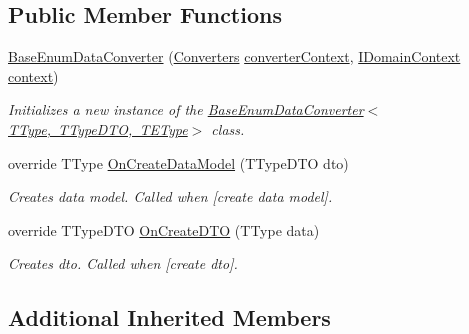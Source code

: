 \subsection*{Public Member Functions}
\begin{DoxyCompactItemize}
\item 
\mbox{\hyperlink{class_bar_none_1_1_shared_1_1_data_converters_1_1_core_1_1_base_enum_data_converter_a3696f6d6da7417940d0ab76b4e64f990}{Base\+Enum\+Data\+Converter}} (\mbox{\hyperlink{class_bar_none_1_1_shared_1_1_data_converters_1_1_converters}{Converters}} \mbox{\hyperlink{class_bar_none_1_1_shared_1_1_data_converter_1_1_core_1_1_base_data_converter_aa680c5a5e00d4330616f98e3cacffa42}{converter\+Context}}, \mbox{\hyperlink{interface_bar_none_1_1_shared_1_1_core_1_1_i_domain_context}{I\+Domain\+Context}} \mbox{\hyperlink{class_bar_none_1_1_shared_1_1_data_converter_1_1_core_1_1_base_data_converter_ae96bc28386162a9cff2a303c270a12b4}{context}})
\begin{DoxyCompactList}\small\item\em Initializes a new instance of the \mbox{\hyperlink{class_bar_none_1_1_shared_1_1_data_converters_1_1_core_1_1_base_enum_data_converter_a3696f6d6da7417940d0ab76b4e64f990}{Base\+Enum\+Data\+Converter$<$\+T\+Type, T\+Type\+D\+T\+O, T\+E\+Type$>$}} class. \end{DoxyCompactList}\item 
override T\+Type \mbox{\hyperlink{class_bar_none_1_1_shared_1_1_data_converters_1_1_core_1_1_base_enum_data_converter_a9915e8d46fd529a7ea43d78d56e024a7}{On\+Create\+Data\+Model}} (T\+Type\+D\+TO dto)
\begin{DoxyCompactList}\small\item\em Creates data model. Called when \mbox{[}create data model\mbox{]}. \end{DoxyCompactList}\item 
override T\+Type\+D\+TO \mbox{\hyperlink{class_bar_none_1_1_shared_1_1_data_converters_1_1_core_1_1_base_enum_data_converter_a50527a2d6f85fd644a49f3a3c77d60be}{On\+Create\+D\+TO}} (T\+Type data)
\begin{DoxyCompactList}\small\item\em Creates dto. Called when \mbox{[}create dto\mbox{]}. \end{DoxyCompactList}\end{DoxyCompactItemize}
\subsection*{Additional Inherited Members}


